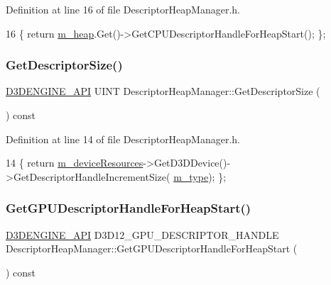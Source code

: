 Definition at line 16 of file Descriptor\+Heap\+Manager.\+h.


\begin{DoxyCode}
16 \{ \textcolor{keywordflow}{return} \mbox{\hyperlink{class_descriptor_heap_manager_a373ccb68b5f147346d24469f8b46e2f4}{m\_heap}}.Get()->GetCPUDescriptorHandleForHeapStart(); \};
\end{DoxyCode}
\mbox{\label{class_descriptor_heap_manager_ac772aa7fc2f22d105a2ecd02367fc1b0}} 
\subsubsection{\texorpdfstring{Get\+Descriptor\+Size()}{GetDescriptorSize()}}
{\footnotesize\ttfamily \mbox{\hyperlink{stdafx_8h_a8ee2d990c5dfba7794dd2b60741d7722}{D3\+D\+E\+N\+G\+I\+N\+E\+\_\+\+A\+PI}} U\+I\+NT Descriptor\+Heap\+Manager\+::\+Get\+Descriptor\+Size (\begin{DoxyParamCaption}{ }\end{DoxyParamCaption}) const\hspace{0.3cm}{\ttfamily [inline]}}



Definition at line 14 of file Descriptor\+Heap\+Manager.\+h.


\begin{DoxyCode}
14 \{ \textcolor{keywordflow}{return} \mbox{\hyperlink{class_descriptor_heap_manager_a6a5e1513f7c9b6ba048796882e16de01}{m\_deviceResources}}->GetD3DDevice()->GetDescriptorHandleIncrementSize(
      \mbox{\hyperlink{class_descriptor_heap_manager_a97dc1db0ffbcb980be70180fdd3e97dd}{m\_type}}); \};
\end{DoxyCode}
\mbox{\label{class_descriptor_heap_manager_a9d1ca4a074100e3ab22f28402fbaa377}} 
\subsubsection{\texorpdfstring{Get\+G\+P\+U\+Descriptor\+Handle\+For\+Heap\+Start()}{GetGPUDescriptorHandleForHeapStart()}}
{\footnotesize\ttfamily \mbox{\hyperlink{stdafx_8h_a8ee2d990c5dfba7794dd2b60741d7722}{D3\+D\+E\+N\+G\+I\+N\+E\+\_\+\+A\+PI}} D3\+D12\+\_\+\+G\+P\+U\+\_\+\+D\+E\+S\+C\+R\+I\+P\+T\+O\+R\+\_\+\+H\+A\+N\+D\+LE Descriptor\+Heap\+Manager\+::\+Get\+G\+P\+U\+Descriptor\+Handle\+For\+Heap\+Start (\begin{DoxyParamCaption}{ }\end{DoxyParamCaption}) const\hspace{0.3cm}{\ttfamily [inline]}}



